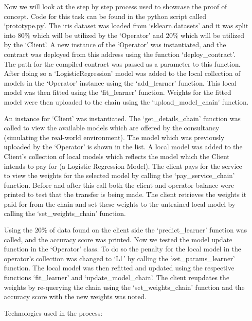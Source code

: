 \noindent
Now we will look at the step by step process used to showcase the proof of concept. Code for this task can be found in the python script called ‘prototype.py’. The iris dataset was loaded from ‘sklearn.datasets’ and it was split into 80\% which will be utilized by the ‘Operator’ and 20\% which will be utilized  by the ‘Client’. A new instance of the ‘Operator’ was instantiated, and the contract was deployed from this address using the function ‘deploy\_contract’. The path for the compiled contract was passed as a parameter to this function. After doing so a ‘LogisticRegression’ model was added to the local collection of models in the ‘Operator’ instance using the ‘add\_learner’ function. This local model was then fitted using the ‘fit\_learner’ function. Weights for the fitted model were then uploaded to the chain using the ‘upload\_model\_chain’ function. 

\noindent
An instance for ‘Client’ was instantiated. The ‘get\_details\_chain’ function was called to view the available models which are offered by the consultancy (simulating the real-world environment). The model which was previously uploaded by the ‘Operator’ is shown in the list.  A local model was added to the Client’s collection of local models which reflects the model which the Client intends to pay for (a Logistic Regression Model). The client pays for the service to view the weights for the selected model by calling the ‘pay\_service\_chain’ function. Before and after this call both the client and operator balance were printed to test that the transfer is being made. The client retrieves the weights it paid for from the chain and set these weights to the untrained local model by calling the ‘set\_weights\_chain’ function.

\noindent
Using the 20\% of data found on the client side the ‘predict\_learner’ function was called, and the accuracy score was printed. Now we tested the model update function in the ‘Operator’ class. To do so the penalty for the local model in the operator’s collection was changed to ‘L1’ by calling the ‘set\_params\_learner’ function. The local model was then refitted and updated using the respective functions ‘fit\_learner’ and ‘update\_model\_chain’. The client reupdates the weights by re-querying the chain using the ‘set\_weights\_chain’ function and the accuracy score with the new weights was noted.

\noindent 
Technologies used in the process:

